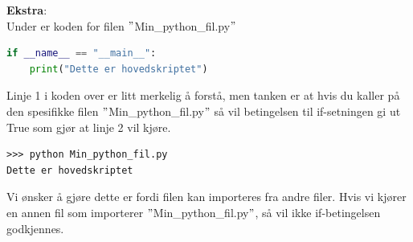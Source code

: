 \textbf{Ekstra}: \\
Under er koden for filen $"$Min\_python\_fil.py$"$
\begin{lstlisting}[language=python]
if __name__ == "__main__":
    print("Dette er hovedskriptet")
\end{lstlisting}

Linje 1 i koden over er litt merkelig å forstå, men tanken er at hvis du kaller på den spesifikke filen  $"$Min\_python\_fil.py$"$ så vil betingelsen til if-setningen gi ut True som gjør at linje 2 vil kjøre.

\begin{lstlisting}
>>> python Min_python_fil.py
Dette er hovedskriptet
\end{lstlisting}
 Vi ønsker å gjøre dette er fordi filen kan importeres fra andre filer. Hvis vi kjører en annen fil som importerer  $"$Min\_python\_fil.py$"$, så vil ikke if-betingelsen godkjennes.  

